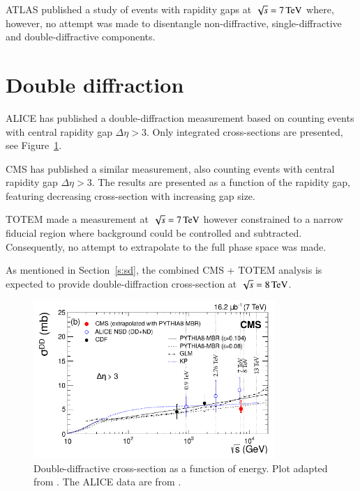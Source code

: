 \documentclass{webofc}
\def\un#1{\,{\rm #1}}
\begin{document}
ATLAS published a study of events with rapidity gaps \cite{atlas-rap-gap-7tev} at $\sqrt s = 7\un{TeV}$ where, however, no attempt was made to disentangle non-diffractive, single-diffractive and double-diffractive components.


\section{Double diffraction}
\label{s:dd}

ALICE has published \cite{alice-inel-sd-dd} a double-diffraction measurement based on counting events with central rapidity gap $\Delta\eta > 3$. Only integrated cross-sections are presented, see Figure~\ref{f:dd cs summary}.

CMS has published \cite{cms-diff-7tev} a similar measurement, also counting events with central rapidity gap $\Delta\eta > 3$. The results are presented as a function of the rapidity gap, featuring decreasing cross-section with increasing gap size.

TOTEM made a measurement at $\sqrt s = 7\un{TeV}$ \cite{totem-dd-7tev} however constrained to a narrow fiducial region where background could be controlled and subtracted. Consequently, no attempt to extrapolate to the full phase space was made.

As mentioned in Section~\ref{s:sd}, the combined CMS + TOTEM analysis is expected to provide double-diffraction cross-section at $\sqrt s = 8\un{TeV}$.

\begin{figure}[h]
\centering
\includegraphics[height=6cm,clip]{fig/si_dd_vs_s.pdf}
\vskip-4mm
\caption{Double-diffractive cross-section as a function of energy. Plot adapted from \cite{cms-diff-7tev}. The ALICE data are from \cite{alice-inel-sd-dd}.}
\label{f:dd cs summary}
\end{figure}
\end{document}
